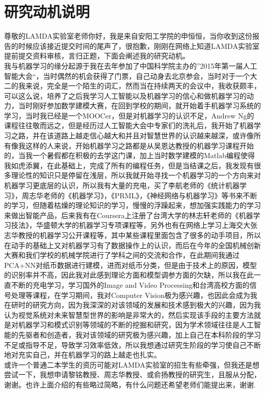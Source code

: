 \documentclass[UTF8,nofonts,a4paper]{ctexart}
\begin{document}

\CTEXoptions[abstractname={\zihao{3}研究动机说明}]

\section*{研究动机说明}
尊敬的LAMDA实验室老师你好，我是来自安阳工学院的申恒恒，当你收到这份报告的时候应该接近提交时间的尾声了，很抱歉，刚刚在网络上知道LAMDA实验室提前提交资料审核，言归正题，下面会阐述我的研究动机。\\
\indent 我与机器学习的缘分起源于我在去年参加了中国科学院主办的”2015年第一届人工智能大会“，当时偶然的机会获得了门票，自己动身去北京参会，当时对于一个大二的我来说，完全是一个陌生的词汇，然而当在持续两天的会议中，我收获颇丰，可以这么说，培养了之后我学习人工智能以及机器学习的信心和做机器学习的动力，当时刚好参加数学建模大赛，在回到学校的期间，就开始着手机器学习系统的学习，当时我已经是一个MOOCer，但是对机器学习的认识不足，Andrew Ng的课程往往敬而远之，但是经历过人工智能大会中专家们的洗礼后，我开始了机器学习之路，并在该道路上越走信心越大和并且对智慧世界的认识越来越深，或许像所有像我这样的人来说，开始机器学习之路都是从吴恩达教授的机器学习课程开始的，当我一个暑假都在积极的去学这门课，加上当时数学建模的Matlab编程使得我如虎添翼，在此基础上，完成了所有的编程任务，但是当结课之后，我发现有很多理论性的知识只是停留在浅层，所以我就开始寻找一个机器学习的一个方向来对机器学习更底层的认识，所以我有大量的充电，买了李航老师的《统计机器学习》，周志华老师的《机器学习》，《PRML》，《神经网络与机器学习》等书来不断的学习，但随着枯燥的理论知识的学习，慢慢的浮躁起来，想加强实践能力的学习来做出智能产品，后来我有在Coursera上注册了台湾大学的林志轩老师的《机器学习技法》，华盛顿大学的机器学习专项课程等，另外也有在网络上学习上海交大张志华教授的机器学习公开课程等，其中某些课程里面包含了很多的动手项目，所以在动手的基础上又对机器学习有了数据操作上的认识，而后在今年的全国机械创新大赛和我们学校的机械学院进行了学科之间的交流和合作，在此期间我通过PCA+NN对纸币数据进行建模，进而对纸币分类，但是由于技术上的原因，模型的识别率并不高，因此我对此感到理论方面和模型调参方面的欠缺，所以我在此一直不断的充电学习，学习国外的Image and Video Processing和台湾高校方面的信号处理等课程，在学习期间，我对Computer Vision极为感兴趣，也因此会成为我在研时的研究方向，因为我深深的对该领域的发展和技术感到极大的兴趣，因为我认为视觉系统对未来智慧型世界的影响是非常大的，然后实现该手段的主要方法就是对机器学习和模式识别等领域的不断的挖掘和研究，因为学术领域往往是人工智能的先驱者和创造者，我对该领域的研究极为感兴趣，加上自己在本科阶段的学习不足或指导不足，导致学习效率低效，所以我想通过研究生阶段的学习使自己不断地对充实自己，并在机器学习的路上越走也扎实。\\
\indent 或许一个普通二本学生的资历可能对LAMDA实验室的招生有些牵强，但我还是想尝试一下，我想申请黎铭教授、周志华教授、或俞扬教授的研究生，且服从分配，谢谢。也许上面介绍的有些略过简略，有什么问题还希望老师们能提出来，谢谢.\\
\end{document}
